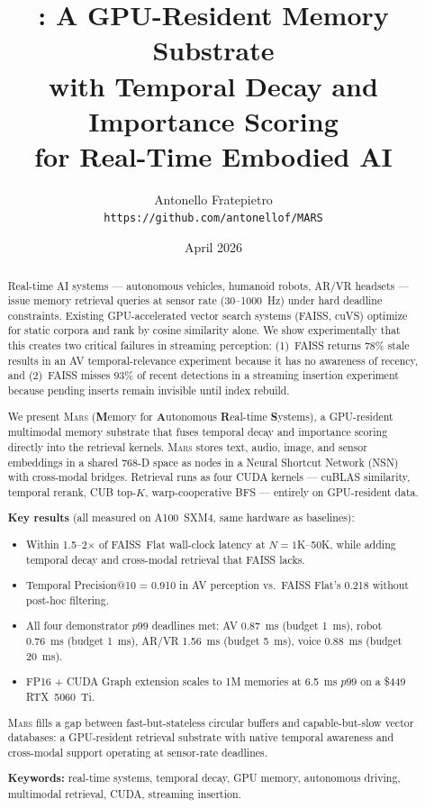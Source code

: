 \documentclass[11pt]{article}
\title{\vspace{-1.5cm}\mars{}: A GPU-Resident Memory Substrate\\
with Temporal Decay and Importance Scoring\\
for Real-Time Embodied AI}
\author{Antonello Fratepietro\\
\texttt{https://github.com/antonellof/MARS}}
\date{April 2026}
\newcommand{\mars}{\textsc{Mars}}
\begin{document}
\maketitle

\begin{abstract}
Real-time AI systems --- autonomous vehicles, humanoid robots, AR/VR
headsets --- issue memory retrieval queries at sensor rate (30--1000~Hz)
under hard deadline constraints. Existing GPU-accelerated vector search
systems (FAISS, cuVS) optimize for static corpora and rank by cosine
similarity alone. We show experimentally that this creates two critical
failures in streaming perception: (1)~FAISS returns 78\% stale results
in an AV temporal-relevance experiment because it has no awareness of
recency, and (2)~FAISS misses 93\% of recent detections in a streaming
insertion experiment because pending inserts remain invisible until
index rebuild.

We present \mars{} (\textbf{M}emory for \textbf{A}utonomous
\textbf{R}eal-time \textbf{S}ystems), a GPU-resident multimodal memory
substrate that fuses temporal decay and importance scoring directly into
the retrieval kernels. \mars{} stores text, audio, image, and sensor
embeddings in a shared 768-D space as nodes in a Neural Shortcut
Network (NSN) with cross-modal bridges. Retrieval runs as four CUDA
kernels --- cuBLAS similarity, temporal rerank, CUB top-$K$,
warp-cooperative BFS --- entirely on GPU-resident data.

\medskip\noindent\textbf{Key results} (all measured on A100~SXM4, same
hardware as baselines):
\begin{itemize}
\setlength{\itemsep}{1pt}\setlength{\parskip}{0pt}
\item Within 1.5--2$\times$ of FAISS~Flat wall-clock latency at
  $N{=}1$K--50K, while adding temporal decay and cross-modal retrieval
  that FAISS lacks.
\item Temporal Precision@10 = 0.910 in AV perception vs.\ FAISS
  Flat's 0.218 without post-hoc filtering.
\item All four demonstrator $p99$ deadlines met: AV 0.87~ms (budget
  1~ms), robot 0.76~ms (budget 1~ms), AR/VR 1.56~ms (budget 5~ms),
  voice 0.88~ms (budget 20~ms).
\item FP16 + CUDA Graph extension scales to 1M memories at 6.5~ms
  $p99$ on a \$449 RTX~5060~Ti.
\end{itemize}

\noindent \mars{} fills a gap between fast-but-stateless circular
buffers and capable-but-slow vector databases: a GPU-resident retrieval
substrate with native temporal awareness and cross-modal support
operating at sensor-rate deadlines.

\textbf{Keywords:} real-time systems, temporal decay, GPU memory,
autonomous driving, multimodal retrieval, CUDA, streaming insertion.
\end{abstract}
\end{document}
